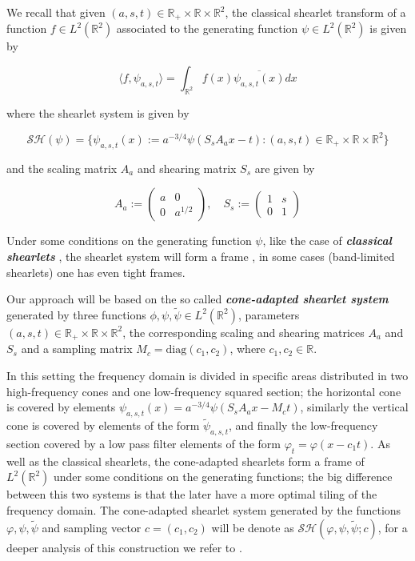 \documentclass[a4paper]{article}
\begin{document}
We recall that given $(a,s,t)\in\mathbb{R}_{+}\times\mathbb{R}\times\mathbb{R}^2$, the classical shearlet transform of a function $f\in L^2(\mathbb{R}^2)$ associated to the generating function $\psi\in L^2(\mathbb{R}^2)$ is given by 

\begin{equation}
\label{eq:class_shear}
\langle f, \psi_{a,s,t}\rangle = \int_{\mathbb{R}^2} f(x)\overline{\psi_{a,s,t}(x)}dx
\end{equation}

where the shearlet system is given by

$$
\mathcal{SH}(\psi)=\{\psi_{a,s,t}(x):=a^{-3/4}\psi(S_sA_ax-t):(a,s,t)\in\mathbb{R}_+\times\mathbb{R}\times\mathbb{R}^2\}
$$

and the scaling matrix $A_a$ and shearing matrix $S_s$ are given by

$$
A_a := \left( \begin{matrix} a & 0 \\ 0 & a^{1/2}\end{matrix}\right), \quad S_s := \left(\begin{matrix} 1 & s \\ 0 & 1 \end{matrix}\right)
$$

Under some conditions on the generating function $\psi$, like the case of \textbf{\textit{classical shearlets}} \cite[p.~19]{ShearletsGitta}, the shearlet system will form a frame , in some cases (band-limited shearlets) one has even tight frames.

\bigskip

Our approach will be based on the so called \textbf{\textit{cone-adapted shearlet system}} generated by three functions $\phi,\psi,\tilde{\psi}\in L^ 2(\mathbb{R}^2)$, parameters $(a,s,t)\in\mathbb{R}_{+}\times\mathbb{R}\times\mathbb{R}^2$, the corresponding scaling and shearing matrices $A_a$ and $S_s$ and a sampling matrix $M_c=\text{diag}(c_1,c_2)$, where $c_1,c_2\in\mathbb{R}$.

\bigskip

In this setting the frequency domain is divided in specific areas distributed in two high-frequency cones and one low-frequency squared section; the horizontal cone is covered by elements $\psi_{a,s,t}(x)=a^{-3/4}\psi(S_sA_ax-M_ct)$, similarly the vertical cone is covered by elements of the form $\tilde{\psi}_{a,s,t}$, and finally the low-frequency section covered by a low pass filter elements of the form $\varphi_t = \varphi(x-c_1t)$. As well as the classical shearlets, the cone-adapted shearlets form a frame of $L^2(\mathbb{R}^2)$ under some conditions on the generating functions; the big difference between this two systems is that the later have a more optimal tiling of the frequency domain. The cone-adapted shearlet system generated by the functions $\varphi,\psi,\tilde{\psi}$ and sampling vector $c=(c_1,c_2)$ will be denote as $\mathcal{SH}(\varphi,\psi,\tilde{\psi};c)$, for a deeper analysis of this construction we refer to \cite{ConstructCompactShear}.
\end{document}
